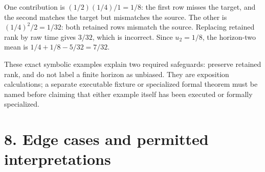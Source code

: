 One contribution is \((1/2)(1/4)/1=1/8\): the first row misses the target, and the second matches the target but mismatches the source. The other is \((1/4)^2/2=1/32\): both retained rows mismatch the source. Replacing retained rank by raw time gives \(3/32\), which is incorrect. Since \(u_2=1/8\), the horizon-two mean is \(1/4+1/8-5/32=7/32\).

These exact symbolic examples explain two required safeguards: preserve retained rank, and do not label a finite horizon as unbiased. They are exposition calculations; a separate executable fixture or specialized formal theorem must be named before claiming that either example itself has been executed or formally specialized.

\section{8. Edge cases and permitted interpretations}\label{edge-cases-and-permitted-interpretations}

